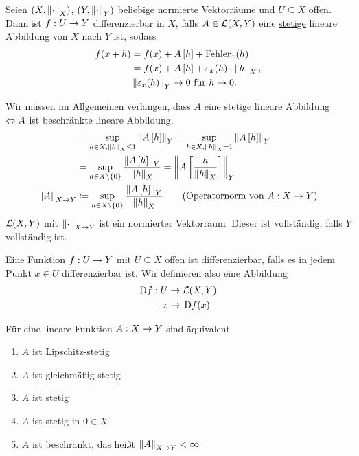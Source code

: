 \begin{definition}
    Seien $\left(X, \left\lVert\cdot\right\rVert_X\right)$, $\left(Y, \left\lVert\cdot\right\rVert_Y\right)$ beliebige normierte Vektorräume und $U\subseteq X$ offen. Dann ist $f: U\rightarrow{} Y$ differenzierbar in $X$, falls $A\in\mL\of{X, Y}$ eine \underline{stetige} lineare Abbildung von $X$ nach $Y$ ist, sodass
    \begin{align*}
        f\of{x+h} &= f\of{x} + A\interv{h} + \fehler_x\of{h}\\
        &= f\of{x} + A\interv{h} + \varepsilon_x\of{h}\cdot\norm{h}_X,\\
        &\norm{\varepsilon_x\of{h}}_Y \fromto 0 \text{ für } h\fromto 0.
    \end{align*}
\end{definition}

\begin{bemerkung}
    Wir müssen im Allgemeinen verlangen, dass $A$ eine stetige lineare Abbildung $\Leftrightarrow{} A$ ist beschränkte lineare Abbildung.
    \begin{align*}
        &= \sup_{h\in X, \norm{h}_X \leq 1} \norm{A\interv{h}}_Y = \sup_{h\in X, \norm{h}_X = 1} \norm{A\interv{h}}_Y\\
        &= \sup_{h\in X\exclude\set{0}} \frac{\norm{A\interv{h}}_Y}{\norm{h}_X} = \norm{A\interv{\frac{h}{\norm{h}_X}}}_Y\\
        \norm{A}_{X\fromto Y} &\coloneqq \sup_{h\in X\exclude\set{0}} \frac{\norm{A\interv{h}}_Y}{\norm{h}_X}\tag{Operatornorm von $A: X\fromto Y$}
    \end{align*}
    $\mL\of{X,Y}$ mit $\left\lVert\cdot\right\rVert_{X\rightarrow{} Y}$ ist ein normierter Vektorraum. Dieser ist vollständig, falls $Y$ vollständig ist.
\end{bemerkung}

\begin{definition}
    Eine Funktion $f: U\rightarrow{} Y$ mit $U\subseteq X$ offen ist differenzierbar, falls es in jedem Punkt $x\in U$ differenzierbar ist. Wir definieren also eine Abbildung
    \begin{align*}
        \D f: U&\fromto\mL\of{X, Y}\\
        x&\fromto\D f\of{x}
    \end{align*}
\end{definition}

\begin{satz}
    Für eine lineare Funktion $A: X\rightarrow{} Y$ sind äquivalent
    \begin{enumerate}[label=(\roman*)]
        \item $A$ ist Lipschitz-stetig
        \item $A$ ist gleichmäßig stetig
        \item $A$ ist stetig
        \item $A$ ist stetig in $0\in X$
        \item $A$ ist beschränkt, das heißt $\left\lVert A\right\rVert_{X\rightarrow{} Y} < \infty$
    \end{enumerate}
\end{satz}

